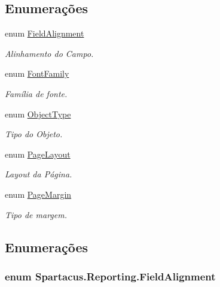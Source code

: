 \subsection*{Enumerações}
\begin{DoxyCompactItemize}
\item 
enum \hyperlink{namespaceSpartacus_1_1Reporting_a1b74021bf4e6e2fe6eac8a1aebddd05e}{Field\+Alignment} 
\begin{DoxyCompactList}\small\item\em Alinhamento do Campo. \end{DoxyCompactList}\item 
enum \hyperlink{namespaceSpartacus_1_1Reporting_a9108ed8004cb83935ed4785cc790fddf}{Font\+Family} 
\begin{DoxyCompactList}\small\item\em Família de fonte. \end{DoxyCompactList}\item 
enum \hyperlink{namespaceSpartacus_1_1Reporting_a3727122f6fe78a79014ed0180e0ac2e3}{Object\+Type} 
\begin{DoxyCompactList}\small\item\em Tipo do Objeto. \end{DoxyCompactList}\item 
enum \hyperlink{namespaceSpartacus_1_1Reporting_a5e056b0c6896c4426cb938d08c5acb34}{Page\+Layout} 
\begin{DoxyCompactList}\small\item\em Layout da Página. \end{DoxyCompactList}\item 
enum \hyperlink{namespaceSpartacus_1_1Reporting_ab924f4d0d38ee1ef2a116121e4ec44fa}{Page\+Margin} 
\begin{DoxyCompactList}\small\item\em Tipo de margem. \end{DoxyCompactList}\end{DoxyCompactItemize}


\subsection{Enumerações}
\hypertarget{namespaceSpartacus_1_1Reporting_a1b74021bf4e6e2fe6eac8a1aebddd05e}{
\subsubsection[{Field\+Alignment}]{\setlength{\rightskip}{0pt plus 5cm}enum {\bf Spartacus.\+Reporting.\+Field\+Alignment}}}\label{namespaceSpartacus_1_1Reporting_a1b74021bf4e6e2fe6eac8a1aebddd05e}


